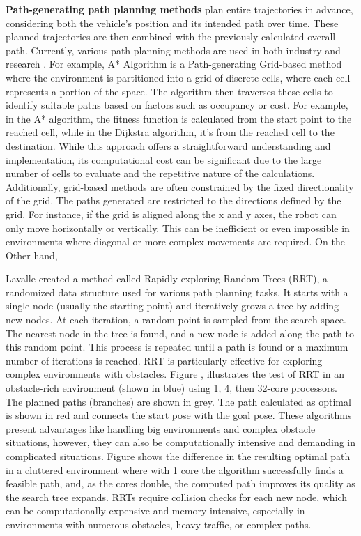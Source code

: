 \textbf{Path-generating path planning methods} plan entire trajectories in advance, considering both the 
vehicle's position and its intended path over time. These planned trajectories are then combined with 
the previously calculated overall path. Currently, various path planning methods are used in both industry 
and research \cite{R28}.
For example, A* Algorithm is a Path-generating Grid-based method where
the environment is partitioned into a grid of discrete cells, where each cell represents a 
portion of the space. 
The algorithm then traverses these cells to identify suitable paths based on factors such as occupancy 
or cost. For example, in the A* algorithm, the fitness function is calculated from the start point 
to the reached cell, while in the Dijkstra algorithm, it's from the reached cell to the destination. 
While this approach offers a straightforward understanding and implementation, its computational cost 
can be significant due to the large number of cells to evaluate and the repetitive nature of the 
calculations. Additionally, grid-based methods are often constrained by the fixed directionality 
of the grid. The paths generated are restricted to the directions defined by the grid. 
For instance, if the grid is aligned along the x and y axes, the robot can only move horizontally 
or vertically. This can be inefficient or even impossible in environments where diagonal 
or more complex movements are required.
On the Other hand, 

Lavalle created a method called Rapidly-exploring Random Trees (RRT), a randomized data structure used 
for various path planning tasks. It starts with a single node (usually the starting point)
and iteratively grows a tree by adding new nodes. At each iteration, a random point is sampled from 
the search space. The nearest node in the tree is found, and a new node is added along the path to 
this random point. This process is repeated until a path is found or a maximum number of iterations 
is reached. RRT is particularly effective for exploring complex environments with obstacles. 
Figure , illustrates the test of RRT in an obstacle-rich environment (shown in blue)
using 1, 4, then 32-core processors. The planned paths (branches) are shown in grey. 
The path calculated as optimal is shown in red and connects the start pose with the goal pose.
These algorithms present advantages like handling big environments and complex obstacle
situations, however, they can also be computationally intensive and demanding in complicated situations.
Figure  shows the difference in the resulting optimal path in a cluttered environment where with
1 core the algorithm successfully finds a feasible path, and, as the cores double, the computed path
improves its quality as the search tree expands. 
RRTs require collision checks for each new node, which can be computationally expensive and memory-intensive, 
especially in environments with numerous obstacles, heavy traffic, or complex paths.


